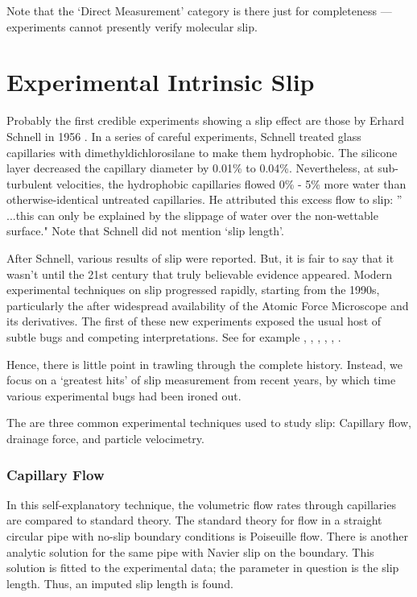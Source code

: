 \documentclass[12pt, a4paper, twoside, openright]{book}
\begin{document}
Note that the `Direct Measurement' category is there just for completeness --- experiments cannot presently verify molecular slip.

\clearpage
\section{Experimental Intrinsic Slip}

Probably the first credible experiments showing a slip effect are those by Erhard Schnell in 1956 \cite{Schnell1956}. In a series of careful experiments, Schnell treated glass capillaries with dimethyldichlorosilane to make them hydrophobic. The silicone layer decreased the capillary diameter by 0.01\% to 0.04\%. Nevertheless, at sub-turbulent velocities, the hydrophobic capillaries flowed 0\% - 5\% more water than otherwise-identical untreated capillaries. He attributed this excess flow to slip: '' ...this can only be explained by the slippage of water over the non-wettable surface."  Note that Schnell did not mention `slip length'.

After Schnell, various results of slip were reported. But, it is fair to say that it wasn't until the 21st century that truly believable evidence appeared.
Modern experimental techniques on slip progressed rapidly, starting from the 1990s, particularly the after widespread availability of the Atomic Force Microscope and its derivatives. The first of these new experiments exposed the usual host of subtle bugs and competing interpretations. See for example \cite{Pit2000}, \cite{CraigNetoWilliams2001}, \cite{BaudryCharlaix2001}, \cite{ZhuGranick2001}, \cite{Bonaccurso2002}, \cite{Neto2003}.

Hence, there is little point in trawling through the complete history. Instead, we focus on a `greatest hits' of slip measurement from recent years, by which time various experimental bugs had been ironed out.

The are three common experimental techniques used to study slip: Capillary flow, drainage force, and particle velocimetry.

\subsubsection*{Capillary Flow}

In this self-explanatory technique, the volumetric flow rates through capillaries are compared to standard theory.  The standard theory for flow in a straight circular pipe with no-slip boundary conditions is Poiseuille flow.  There is another analytic solution for the same pipe with Navier slip on the boundary. This solution is fitted to the experimental data; the parameter in question is the slip length.  Thus, an imputed slip length is found.
\end{document}
